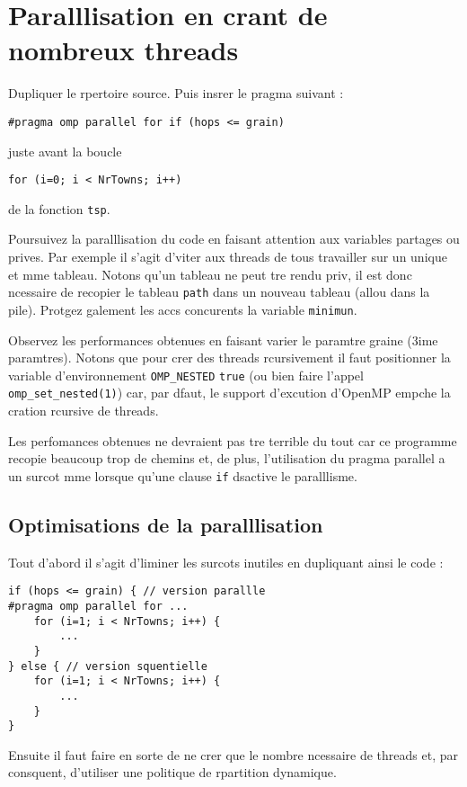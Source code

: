 \documentclass[A4wide]{article}
\begin{document}
\section{Paralllisation en crant de nombreux threads}

Dupliquer le rpertoire source. Puis insrer le pragma suivant :

\verb+#pragma omp parallel for if (hops <= grain)+

juste avant la boucle

\verb_for (i=0; i < NrTowns; i++)_

de la fonction \verb+tsp+.

Poursuivez la paralllisation du code en faisant attention aux
variables partages ou prives. Par exemple il s'agit d'viter aux
threads de tous travailler sur un unique et mme tableau. Notons qu'un
tableau ne peut tre rendu priv, il est donc ncessaire de recopier
le tableau \verb+path+ dans un nouveau tableau (allou dans la
pile). Protgez galement les accs concurents  la variable
\verb#minimun#.

Observez les performances obtenues en faisant varier le paramtre
graine (3ime paramtres). Notons que pour crer des threads
rcursivement il faut positionner la variable d'environnement
\verb+OMP_NESTED+  \verb+true+ (ou bien faire l'appel
\verb#omp_set_nested(1)#) car, par dfaut, le support d'excution
d'OpenMP empche la cration rcursive de threads.


Les perfomances obtenues ne devraient pas tre terrible du tout car ce 
programme recopie beaucoup trop de chemins et, de plus, l'utilisation 
du pragma parallel a un surcot mme lorsque qu'une clause \texttt{if}
dsactive le paralllisme.

\subsection{Optimisations de la paralllisation}

Tout d'abord il s'agit d'liminer les surcots inutiles en dupliquant
ainsi le code :

\begin{verbatim}
if (hops <= grain) { // version parallle
#pragma omp parallel for ...
    for (i=1; i < NrTowns; i++) {
        ...
    }
} else { // version squentielle
    for (i=1; i < NrTowns; i++) {
        ...
    }
}
\end{verbatim}

Ensuite il faut faire en sorte de ne crer que le nombre ncessaire de
threads et, par consquent, d'utiliser une politique de rpartition
dynamique.
\end{document}
